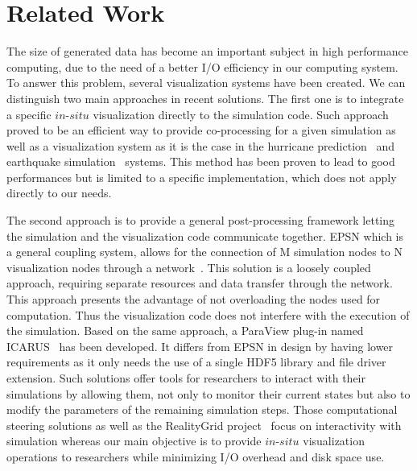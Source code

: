 \section{Related Work}
\label{sec:related}

The size of generated data has become an important subject in high performance 
computing, due to the need of a better I/O efficiency in our computing 
system. To answer this problem, several visualization systems have been created.
We can distinguish two main approaches in recent solutions. The first one is to 
integrate a specific $in$-$situ$ visualization directly to the simulation code. 
Such approach proved to be an efficient way to provide co-processing for a given
simulation as well as a visualization system as it is the case in the hurricane
prediction~\cite{4015457} and earthquake simulation~\cite{4090186} systems.
This method has been proven to lead to good performances but is limited 
to a specific implementation, which does not apply directly to our needs.

The second approach is to provide a general post-processing framework letting the
simulation and the visualization code communicate together. EPSN which is a
general coupling system, allows for the connection of M simulation nodes to N
visualization nodes through a network~\cite{4020782}. This solution is a
loosely coupled approach, requiring separate resources and data transfer
through the network. This approach presents the advantage of not overloading
the nodes used for computation. Thus the visualization code does not interfere
with the execution of the simulation. Based on the same approach, a ParaView
plug-in named ICARUS~\cite{6152102} has been developed. 
It differs from EPSN in design by having lower requirements as it only needs
the use of a single HDF5 library and file driver extension. Such solutions
offer tools for researchers to interact with their simulations by allowing
them, not only to monitor their current states but also to modify
the parameters of the remaining simulation steps. Those computational steering
solutions as well as the RealityGrid
project~\cite{Harting03computationalsteering} focus on interactivity with
simulation whereas our main objective is to provide $in$-$situ$ visualization
operations to researchers while minimizing I/O overhead and disk
space use. 

